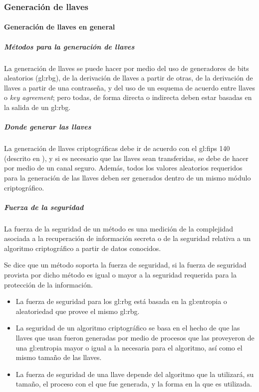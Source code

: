 %
%

\subsubsection{Generación de llaves}
\label{sec:generacion_llaves}


\paragraph{Generación de llaves en general}

\subparagraph{Métodos para la generación de llaves}
La generación de llaves se puede hacer por medio del uso de generadores de 
bits aleatorios (\gls{gl:rbg}), de la derivación de llaves a partir de otras, 
de la derivación de llaves a partir de una contraseña, y del uso de un esquema 
de acuerdo entre llaves o \textit{key agreement}; pero todas, de forma directa 
o indirecta deben estar basadas en la salida de un \gls{gl:rbg}.

\subparagraph{Donde generar las llaves}
La generación de llaves criptográficas debe ir de acuerdo con el \gls{gl:fips} 
140 (descrito en \cite{nist_modulos_criptograficos}), y si es necesario que 
las llaves sean transferidas, se debe de hacer por medio de un canal seguro. 
Además, todos los valores aleatorios requeridos para la generación de las 
llaves deben ser generados dentro de un mismo módulo criptográfico.

\subparagraph{Fuerza de la seguridad}
La fuerza de la seguridad de un método es una medición de la complejidad 
asociada a la recuperación de información secreta o de la seguridad relativa 
a un algoritmo criptográfico a partir de datos conocidos.

Se dice que un método soporta la fuerza de seguridad, si la fuerza de 
seguridad provista por dicho método es igual o mayor a la seguridad 
requerida para la protección de la información.
\begin{itemize}

  \item La fuerza de seguridad para los \gls{gl:rbg} está basada en la 
    \gls{gl:entropia} o aleatoriedad que provee el mismo \gls{gl:rbg}.

  \item La seguridad de un algoritmo criptográfico se basa en el hecho de 
    que las llaves que usan fueron generadas por medio de procesos que las 
    proveyeron de una \gls{gl:entropia} mayor o igual a la necesaria para el 
    algoritmo, así como el mismo tamaño de las llaves.

  \item La fuerza de seguridad de una llave depende del algoritmo que la 
    utilizará, su tamaño, el proceso con el que fue generada, y la forma en 
    la que es utilizada.

\end{itemize}

